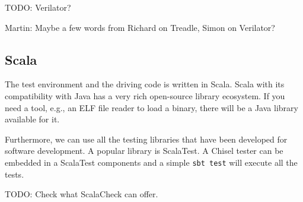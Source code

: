 \documentclass[conference]{IEEEtran}
\newcommand{\code}[1]{{\small{\texttt{#1}}}}
\newcommand{\todo}[1]{{\color{olive} TODO: #1}}
\newcommand{\martin}[1]{{\color{blue} Martin: #1}}
\begin{document}
\todo{Verilator?}

\martin{Maybe a few words from Richard on Treadle, Simon on Verilator?}


\subsection{Scala}

The test environment and the driving code is written in Scala. Scala with its
compatibility with Java has a very rich open-source library ecosystem.
If you need a tool, e.g., an ELF file reader to load a binary, there will be a Java
library available for it.

Furthermore, we can use all the testing libraries that have been developed for
software development. A popular library is ScalaTest. A Chisel tester can be embedded
in a ScalaTest components and a simple \code{sbt test} will execute all the tests.

\todo{Check what ScalaCheck can offer.}
\end{document}
